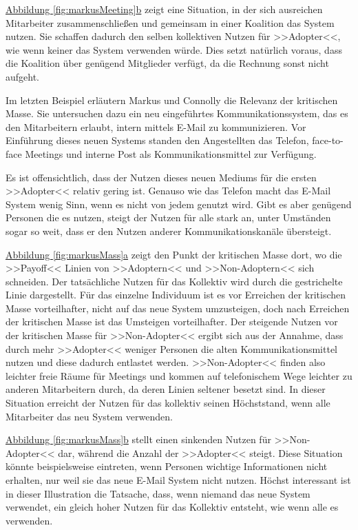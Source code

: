 \hyperref[fig:markusMeeting]{Abbildung \ref*{fig:markusMeeting}b} zeigt eine Situation, in der sich ausreichen Mitarbeiter zusammenschließen und gemeinsam in einer Koalition das System nutzen. Sie schaffen dadurch den selben kollektiven Nutzen für >>Adopter<<, wie wenn keiner das System verwenden würde. Dies setzt natürlich voraus, dass die Koalition über genügend Mitglieder verfügt, da die Rechnung sonst nicht aufgeht.

\medskip Im letzten Beispiel erläutern Markus und Connolly die Relevanz der kritischen Masse. Sie untersuchen dazu ein neu eingeführtes Kommunikationssystem, das es den Mitarbeitern erlaubt, intern mittels E-Mail zu kommunizieren. Vor Einführung dieses neuen Systems standen den Angestellten das Telefon, face-to-face Meetings und interne Post als Kommunikationsmittel zur Verfügung. 

Es ist offensichtlich, dass der Nutzen dieses neuen Mediums für die ersten >>Adopter<< relativ gering ist. Genauso wie das Telefon macht das E-Mail System wenig Sinn, wenn es nicht von jedem genutzt wird. Gibt es aber genügend Personen die es nutzen, steigt der Nutzen für alle stark an, unter Umständen sogar so weit, dass er den Nutzen anderer Kommunikationskanäle übersteigt. 

\medskip \hyperref[fig:markusMass]{Abbildung \ref*{fig:markusMass}a} zeigt den Punkt der kritischen Masse dort, wo die >>Payoff<< Linien von >>Adoptern<< und >>Non-Adoptern<< sich schneiden. Der tatsächliche Nutzen für das Kollektiv wird durch die gestrichelte Linie dargestellt. Für das einzelne Individuum ist es vor Erreichen der kritischen Masse vorteilhafter, nicht auf das neue System umzusteigen, doch nach Erreichen der kritischen Masse ist das Umsteigen vorteilhafter. Der steigende Nutzen vor der kritischen Masse für >>Non-Adopter<< ergibt sich aus der Annahme, dass durch mehr >>Adopter<< weniger Personen die alten Kommunikationsmittel nutzen und diese dadurch entlastet werden. >>Non-Adopter<< finden also leichter freie Räume für Meetings und kommen auf telefonischem Wege leichter zu anderen Mitarbeitern durch, da deren Linien seltener besetzt sind. In dieser Situation erreicht der Nutzen für das kollektiv seinen Höchststand, wenn alle Mitarbeiter das neu System verwenden. 

\medskip \hyperref[fig:markusMass]{Abbildung \ref*{fig:markusMass}b} stellt einen sinkenden Nutzen für >>Non-Adopter<< dar, während die Anzahl der >>Adopter<< steigt. Diese Situation könnte beispielsweise eintreten, wenn Personen wichtige Informationen nicht erhalten, nur weil sie das neue E-Mail System nicht nutzen. Höchst interessant ist in dieser Illustration die Tatsache, dass, wenn niemand das neue System verwendet, ein gleich hoher Nutzen für das Kollektiv entsteht, wie wenn alle es verwenden.

